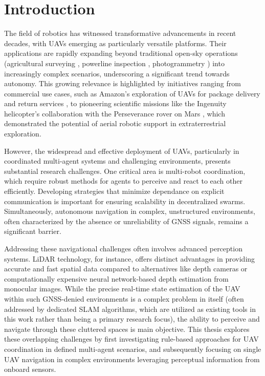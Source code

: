 
\chapter{Introduction\label{chap:introduction}}
The field of robotics has witnessed transformative advancements in recent decades, with \ac{UAV}s emerging as particularly versatile platforms. 
Their applications are rapidly expanding beyond traditional open-sky operations (agricultural surveying \cite{agricultural_survey}, powerline inspection \cite{powerline_inspection}, photogrammetry \cite{photogrammetry}) into increasingly complex scenarios, underscoring a significant trend towards autonomy. 
This growing relevance is highlighted by initiatives ranging from commercial use cases, such as Amazon's exploration of \ac{UAV}s for package delivery and return services \cite{InsiderIntelligence_DroneDelivery}, to pioneering scientific missions like 
  the Ingenuity helicopter's collaboration with the Perseverance rover on Mars \cite{NASA_Ingenuity}, which demonstrated the potential of aerial robotic support in extraterrestrial exploration.

However, the widespread and effective deployment of \ac{UAV}s, particularly in coordinated multi-agent systems and challenging environments, presents substantial research challenges. 
One critical area is multi-robot coordination, which require robust methods for agents to perceive and react to each other efficiently. 
Developing strategies that minimize dependance on explicit communication is important for ensuring scalability in decentralized swarms. 
Simultaneously, autonomous navigation in complex, unstructured environments, often characterized by the absence or unreliability of \ac{GNSS} signals, remains a significant barrier.

Addressing these navigational challenges often involves advanced perception systems. 
\ac{LiDAR} technology, for instance, offers distinct advantages in providing accurate and fast spatial data compared to alternatives like depth cameras or computationally expensive neural network-based depth estimation from monocular images. 
While the precise real-time state estimation of the \ac{UAV} within such \ac{GNSS}-denied environments is a complex problem in itself (often addressed by dedicated \ac{SLAM} algorithms, which are utilized as existing tools in this work rather than being a primary research focus), the ability to perceive and navigate through these cluttered spaces is main objective. 
This thesis explores these overlapping challenges by first investigating rule-based approaches for \ac{UAV} coordination in defined multi-agent scenarios, and subsequently focusing on single \ac{UAV} navigation in complex environments leveraging perceptual information from onboard sensors.



